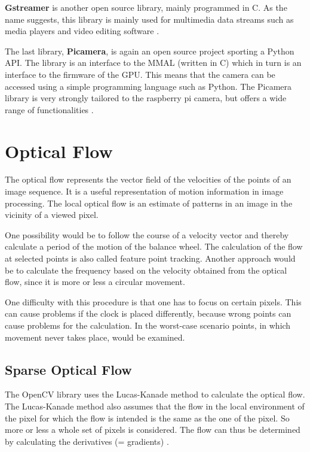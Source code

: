 \documentclass[12pt, a4paper]{report}
\begin{document}
\textbf{Gstreamer} is another open source library, mainly programmed in C. As the name suggests, this library is mainly used for multimedia data streams such as media players and video editing software \cite{gstreamer}.

\bigskip
The last library, \textbf{Picamera}, is again an open source project sporting a Python API. The library is an interface to the MMAL (written in C) which in turn is an interface to the firmware of the GPU. This means that the camera can be accessed using a simple programming language such as Python. The Picamera library is very strongly tailored to the raspberry pi camera, but offers a wide range of functionalities \cite{ReadTheDocsPicamera}.
    
    \section{Optical Flow}
    The optical flow represents the vector field of the velocities of the points of an image sequence. It is a useful representation of motion information in image processing. The local optical flow is an estimate of patterns in an image in the vicinity of a viewed pixel. 
    
    One possibility would be to follow the course of a velocity vector and thereby calculate a period of the motion of the balance wheel. The calculation of the flow at selected points is also called feature point tracking. Another approach would be to calculate the frequency based on the velocity obtained from the optical flow, since it is more or less a circular movement. 
    
    One difficulty with this procedure is that one has to focus on certain pixels. This can cause problems if the clock is placed differently, because wrong points can cause problems for the calculation. In the worst-case scenario points, in which movement never takes place, would be examined.
    
    \subsection{Sparse Optical Flow}
    
    The OpenCV library uses the Lucas-Kanade method to calculate the optical flow. The Lucas-Kanade method also assumes that the flow in the local environment of the pixel for which the flow is intended is the same as the one of the pixel. So more or less a whole set of pixels is considered. The flow can thus be determined by calculating the derivatives (= gradients) \cite{opencv}.
    
\end{document}
